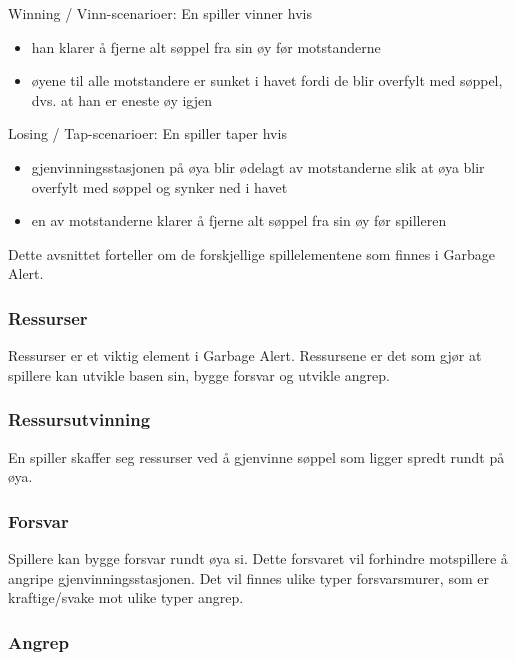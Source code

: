 Winning / Vinn-scenarioer:
En spiller vinner hvis
\begin{itemize}
	\item han klarer å fjerne alt søppel fra sin øy før motstanderne
	\item øyene til alle motstandere er sunket i havet fordi de blir overfylt med søppel, dvs. at han er eneste øy igjen
\end{itemize}

Losing / Tap-scenarioer:
En spiller taper hvis
\begin{itemize}
	\item gjenvinningsstasjonen på øya blir ødelagt av motstanderne slik at øya blir overfylt med søppel og synker ned i havet
	\item en av motstanderne klarer å fjerne alt søppel fra sin øy før spilleren
\end{itemize}
Dette avsnittet forteller om de forskjellige spillelementene som finnes
i Garbage Alert.
\subsubsection{Ressurser}
Ressurser er et viktig element i Garbage Alert. Ressursene er det som
gjør at spillere kan utvikle basen sin, bygge forsvar og utvikle angrep.
\subsubsection{Ressursutvinning}
En spiller skaffer seg ressurser ved å gjenvinne søppel som ligger
spredt rundt på øya.
\subsubsection{Forsvar}
Spillere kan bygge forsvar rundt øya si. Dette forsvaret vil forhindre
motspillere å angripe gjenvinningsstasjonen. Det vil finnes ulike typer
forsvarsmurer, som er kraftige/svake mot ulike typer angrep.
\subsubsection{Angrep}
